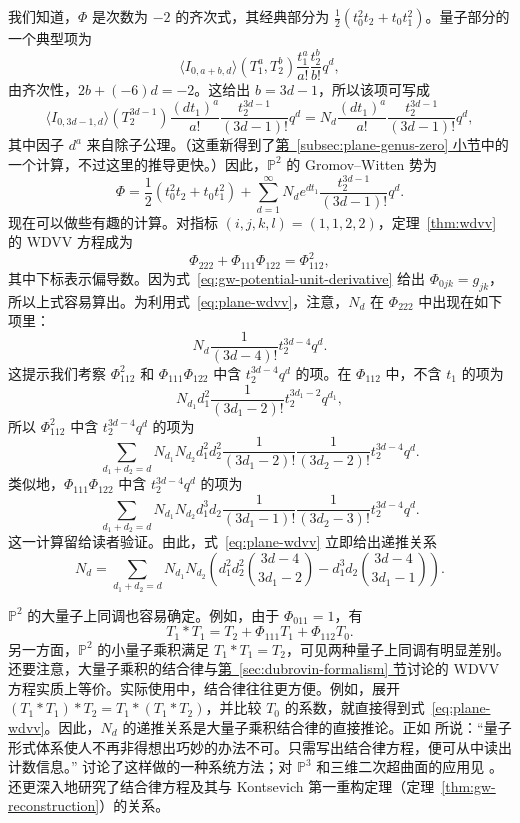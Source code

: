 我们知道，$\Phi$ 是次数为 $-2$ 的齐次式，其经典部分为 $\tfrac12(t_0^2t_2+t_0t_1^2)$。量子部分的一个典型项为
\[
\langle I_{0,a+b,d}\rangle(T_1^a,T_2^b)\frac{t_1^a}{a!}\frac{t_2^b}{b!}q^d,
\]
由齐次性，$2b+(-6)d=-2$。这给出 $b=3d-1$，所以该项可写成
\[
\langle I_{0,3d-1,d}\rangle(T_2^{3d-1})
\frac{(dt_1)^a}{a!}\frac{t_2^{3d-1}}{(3d-1)!}q^d
=N_d\frac{(dt_1)^a}{a!}\frac{t_2^{3d-1}}{(3d-1)!}q^d,
\]
其中因子 $d^a$ 来自除子公理。（这重新得到了\hyperref[subsec:plane-genus-zero]{第~\ref*{subsec:plane-genus-zero} 小节}中的一个计算，不过这里的推导更快。）因此，$\mathbb P^2$ 的 Gromov--Witten 势为
\[
\Phi=\frac12(t_0^2t_2+t_0t_1^2)+\sum_{d=1}^{\infty}
N_de^{dt_1}\frac{t_2^{3d-1}}{(3d-1)!}q^d.
\]
现在可以做些有趣的计算。对指标 $(i,j,k,l)=(1,1,2,2)$，定理~\ref{thm:wdvv} 的 WDVV 方程成为
\begin{equation}\label{eq:plane-wdvv}
\Phi_{222}+\Phi_{111}\Phi_{122}=\Phi_{112}^2,
\end{equation}
其中下标表示偏导数。因为式~\eqref{eq:gw-potential-unit-derivative} 给出 $\Phi_{0jk}=g_{jk}$，所以上式容易算出。为利用式~\eqref{eq:plane-wdvv}，注意，$N_d$ 在 $\Phi_{222}$ 中出现在如下项里：
\[
N_d\frac1{(3d-4)!}t_2^{3d-4}q^d.
\]
这提示我们考察 $\Phi_{112}^2$ 和 $\Phi_{111}\Phi_{122}$ 中含 $t_2^{3d-4}q^d$ 的项。在 $\Phi_{112}$ 中，不含 $t_1$ 的项为
\[
N_{d_1}d_1^2\frac1{(3d_1-2)!}t_2^{3d_1-2}q^{d_1},
\]
所以 $\Phi_{112}^2$ 中含 $t_2^{3d-4}q^d$ 的项为
\[
\sum_{d_1+d_2=d}N_{d_1}N_{d_2}d_1^2d_2^2
\frac1{(3d_1-2)!}\frac1{(3d_2-2)!}t_2^{3d-4}q^d.
\]
类似地，$\Phi_{111}\Phi_{122}$ 中含 $t_2^{3d-4}q^d$ 的项为
\[
\sum_{d_1+d_2=d}N_{d_1}N_{d_2}d_1^3d_2
\frac1{(3d_1-1)!}\frac1{(3d_2-3)!}t_2^{3d-4}q^d.
\]
这一计算留给读者验证。由此，式~\eqref{eq:plane-wdvv} 立即给出递推关系
\[
N_d=\sum_{d_1+d_2=d}N_{d_1}N_{d_2}
\left(d_1^2d_2^2\binom{3d-4}{3d_1-2}
-d_1^3d_2\binom{3d-4}{3d_1-1}\right).
\]

$\mathbb P^2$ 的大量子上同调也容易确定。例如，由于 $\Phi_{011}=1$，有
\[
T_1*T_1=T_2+\Phi_{111}T_1+\Phi_{112}T_0.
\]
另一方面，$\mathbb P^2$ 的小量子乘积满足 $T_1*T_1=T_2$，可见两种量子上同调有明显差别。还要注意，大量子乘积的结合律与\hyperref[sec:dubrovin-formalism]{第~\ref*{sec:dubrovin-formalism} 节}讨论的 WDVV 方程实质上等价。实际使用中，结合律往往更方便。例如，展开 $(T_1*T_1)*T_2=T_1*(T_1*T_2)$，并比较 $T_0$ 的系数，就直接得到式~\eqref{eq:plane-wdvv}。因此，$N_d$ 的递推关系是大量子乘积结合律的直接推论。正如  所说：“量子形式体系使人不再非得想出巧妙的办法不可。只需写出结合律方程，便可从中读出计数信息。” 讨论了这样做的一种系统方法；对 $\mathbb P^3$ 和三维二次超曲面的应用见 。 还更深入地研究了结合律方程及其与 Kontsevich 第一重构定理（定理~\ref{thm:gw-reconstruction}）的关系。

